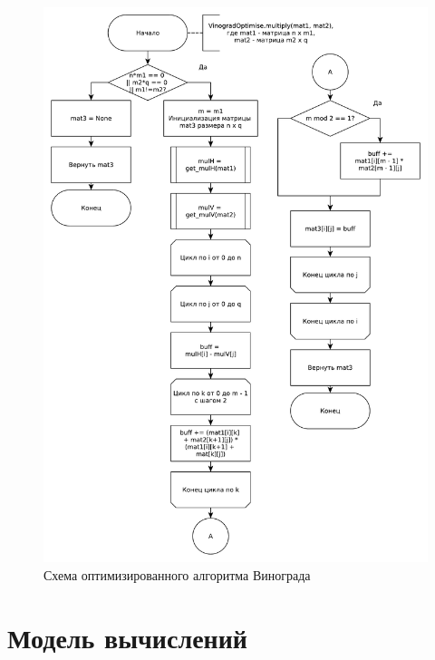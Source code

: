 \documentclass[a4paper,oneside,14pt]{extreport}
\begin{document}
\begin{figure}[H]
	\includegraphics[width=1\linewidth]{images/VinogradOptimise}
	\caption{Схема оптимизированного алгоритма Винограда}
	\label{fig:opt_vinograd}
\end{figure}

\section{Модель вычислений}
\end{document}
